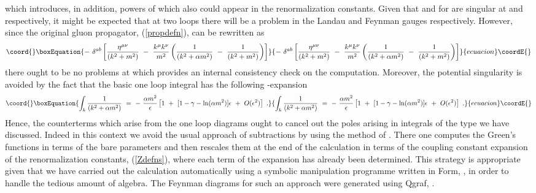 \documentclass[a4paper,11pt]{article}
\begin{document}
which introduces, in addition, powers of \coordHE{} which also could appear
in the renormalization constants. Given that \myHighlight{$\ln\alpha$}\coordHE{} and \coordHE{}
for \coordHE{}  \myHighlight{$\geq$}\coordHE{}  \coordHE{} are singular at \myHighlight{$\alpha$}\coordHE{}  \myHighlight{$=$}\coordHE{}  \coordHE{} and \myHighlight{$\alpha$}\coordHE{}  \myHighlight{$=$}\coordHE{}  \coordHE{}
respectively, it might be expected that at two loops there will be a problem in
the Landau and Feynman gauges respectively. However, since the original gluon
propagator, (\ref{propdefn}), can be rewritten as  
\begin{equation}\coord{}\boxEquation{
-~ \delta^{ab} \left[ \frac{\eta^{\mu\nu}}{(k^2+m^2)} ~-~ 
\frac{k^\mu k^\nu}{m^2} \left( \frac{1}{(k^2+\alpha m^2)} ~-~ 
\frac{1}{(k^2+m^2)} \right) \right] 
}{
-~ \delta^{ab} \left[ \frac{\eta^{\mu\nu}}{(k^2+m^2)} ~-~ 
\frac{k^\mu k^\nu}{m^2} \left( \frac{1}{(k^2+\alpha m^2)} ~-~ 
\frac{1}{(k^2+m^2)} \right) \right] 
}{ecuacion}\coordE{}\end{equation} 
there ought to be no problems at \myHighlight{$\alpha$}\coordHE{}  \myHighlight{$=$}\coordHE{}  \coordHE{} which provides an internal
consistency check on the computation. Moreover, the potential \myHighlight{$\alpha$}\coordHE{}  \myHighlight{$=$}\coordHE{}  \coordHE{}
singularity is avoided by the fact that the basic one loop integral has the 
following \myHighlight{$\epsilon$}\coordHE{}-expansion 
\begin{equation}\coord{}\boxEquation{ 
\int_k \frac{1}{(k^2+\alpha m^2)} ~=~ -~ \frac{\alpha m^2}{\epsilon} \left[
1 ~+~ [1 - \gamma - \ln (\alpha m^2) ] \epsilon ~+~ O(\epsilon^2) \right] ~.  
}{ 
\int_k \frac{1}{(k^2+\alpha m^2)} ~=~ -~ \frac{\alpha m^2}{\epsilon} \left[
1 ~+~ [1 - \gamma - \ln (\alpha m^2) ] \epsilon ~+~ O(\epsilon^2) \right] ~.  
}{ecuacion}\coordE{}\end{equation} 
Hence, the counterterms which arise from the one loop diagrams ought to cancel 
out the \myHighlight{$\ln(\alpha)/\epsilon$}\coordHE{} poles arising in integrals of the type we have 
discussed. Indeed in this context we avoid the usual approach of subtractions 
by using the method of \cite{22}. There one computes the Green's functions in 
terms of the bare parameters and then rescales them at the end of the 
calculation in terms of the coupling constant expansion of the renormalization 
constants, (\ref{Zdefns}), where each term of the expansion has already been 
determined. This strategy is appropriate given that we have carried out the 
calculation automatically using a symbolic manipulation programme written in 
{\sc Form}, \cite{23}, in order to handle the tedious amount of algebra. The 
Feynman diagrams for such an approach were generated using {\sc Qgraf}, 
\cite{24}. 
\end{document}
